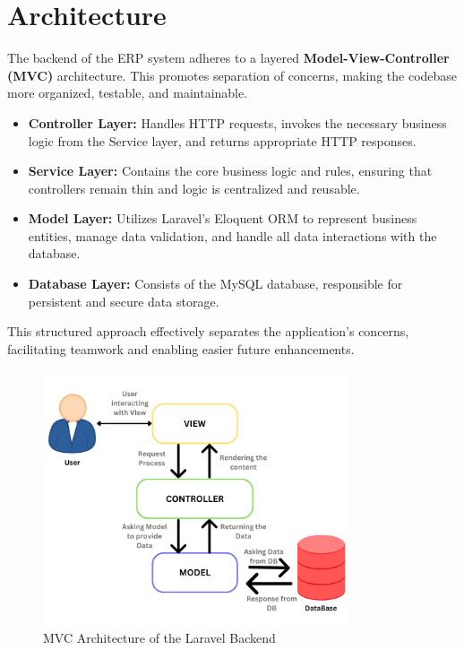 \section{Architecture}
The backend of the ERP system adheres to a layered \textbf{Model-View-Controller (MVC)} architecture. This promotes separation of concerns, making the codebase more organized, testable, and maintainable.
\begin{itemize}
    \item \textbf{Controller Layer:} Handles HTTP requests, invokes the necessary business logic from the Service layer, and returns appropriate HTTP responses.
    \item \textbf{Service Layer:} Contains the core business logic and rules, ensuring that controllers remain thin and logic is centralized and reusable.
    \item \textbf{Model Layer:} Utilizes Laravel's Eloquent ORM to represent business entities, manage data validation, and handle all data interactions with the database.
    \item \textbf{Database Layer:} Consists of the MySQL database, responsible for persistent and secure data storage.
\end{itemize}
This structured approach effectively separates the application's concerns, facilitating teamwork and enabling easier future enhancements.
\begin{figure}[H]
    \centering
    \includegraphics[width=0.8\textwidth]{chapters/chapter 1/figures/mvcArch.png}
    \caption{MVC Architecture of the Laravel Backend}
    \label{fig:mvc}
\end{figure}